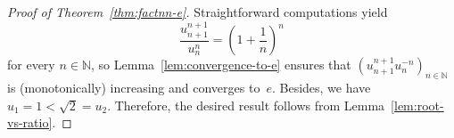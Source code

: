 \documentclass[12pt]{article}
\newcommand{\bN}{\mathbb{N}} %
\begin{document}
\begin{proof}[Proof of Theorem~\ref{thm:factnn-e}]
  Straightforward computations yield
  $$
  \frac{u_{n + 1}^{n + 1}}{u_n^n} 
  = \left(1 + \frac{1}{n} \right)^n  
  $$
  for every $n \in \bN$,
  so Lemma~\ref{lem:convergence-to-e} ensures that 
  $\left( u_{n + 1}^{n + 1} u_n^{- n} \right)_{n \in \bN}$ is (monotonically) increasing and converges to~$e$.
  Besides, we have $u_1 = 1 < \sqrt{2} = u_2$.
  Therefore, the desired result follows from Lemma~\ref{lem:root-vs-ratio}.
\end{proof} 



\end{document}
